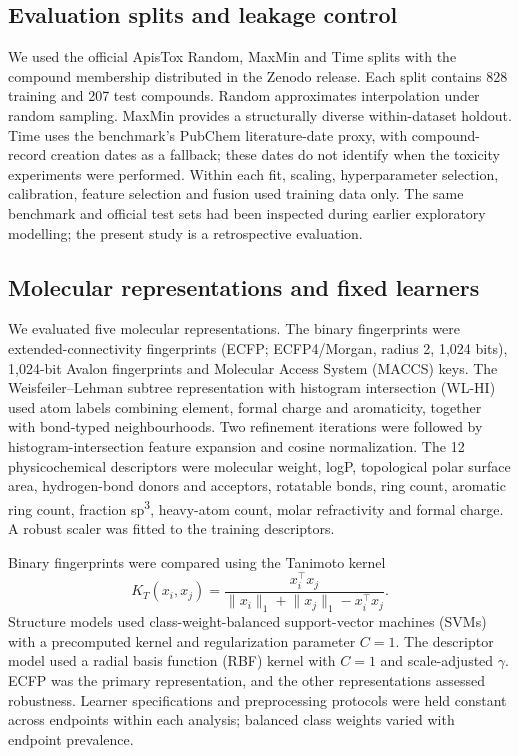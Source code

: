 \documentclass{ieeeaccess}
\begin{document}
\subsection{Evaluation splits and leakage control}
We used the official ApisTox Random, MaxMin and Time splits with the compound membership distributed in the Zenodo release\cite{Adamczyk2025}. Each split contains 828 training and 207 test compounds. Random approximates interpolation under random sampling. MaxMin provides a structurally diverse within-dataset holdout. Time uses the benchmark's PubChem literature-date proxy, with compound-record creation dates as a fallback\cite{Adamczyk2025}; these dates do not identify when the toxicity experiments were performed. Within each fit, scaling, hyperparameter selection, calibration, feature selection and fusion used training data only. The same benchmark and official test sets had been inspected during earlier exploratory modelling; the present study is a retrospective evaluation.

\subsection{Molecular representations and fixed learners}
We evaluated five molecular representations. The binary fingerprints were extended-connectivity fingerprints (ECFP; ECFP4/Morgan, radius 2, 1,024 bits)\cite{Rogers2010}, 1,024-bit Avalon fingerprints\cite{Gedeck2006} and Molecular Access System (MACCS) keys\cite{Durant2002}. The Weisfeiler--Lehman subtree representation with histogram intersection (WL-HI)\cite{Shervashidze2011} used atom labels combining element, formal charge and aromaticity, together with bond-typed neighbourhoods. Two refinement iterations were followed by histogram-intersection feature expansion and cosine normalization. The 12 physicochemical descriptors were molecular weight, logP, topological polar surface area, hydrogen-bond donors and acceptors, rotatable bonds, ring count, aromatic ring count, fraction sp\textsuperscript{3}, heavy-atom count, molar refractivity and formal charge. A robust scaler was fitted to the training descriptors.

Binary fingerprints were compared using the Tanimoto kernel
\begin{equation}
K_T(x_i,x_j)=\frac{x_i^\top x_j}{\lVert x_i\rVert_1+\lVert x_j\rVert_1-x_i^\top x_j}.\label{eq:tanimoto}
\end{equation}
Structure models used class-weight-balanced support-vector machines (SVMs)\cite{Cortes1995} with a precomputed kernel and regularization parameter \(C=1\). The descriptor model used a radial basis function (RBF) kernel with \(C=1\) and scale-adjusted \(\gamma\). ECFP was the primary representation, and the other representations assessed robustness. Learner specifications and preprocessing protocols were held constant across endpoints within each analysis; balanced class weights varied with endpoint prevalence.
\end{document}
